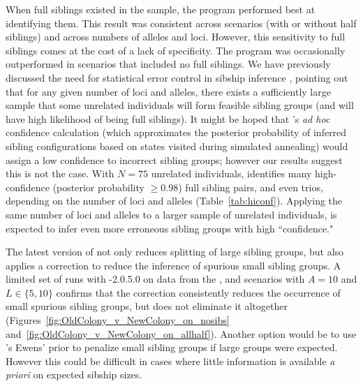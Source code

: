 When full siblings existed in the sample, the program \colony{} performed best at identifying them.  
This result was consistent across scenarios (with or without half siblings) and across numbers of 
alleles and loci.  However, this sensitivity to full siblings comes at the cost of a lack of 
specificity.  The program \colony{} was occasionally outperformed in scenarios that included no full 
siblings.  We have previously discussed the need for statistical error control in 
sibship inference \citep{alm&and11}, pointing out that for any given number of loci and alleles, there 
exists a sufficiently large sample that some unrelated individuals will form feasible sibling groups 
(and will have high likelihood of being full siblings).  It might be hoped that \colony{}'s {\em ad 
hoc} confidence calculation (which approximates the posterior probability of inferred sibling 
configurations based on states visited during simulated annealing) would assign a low confidence to 
incorrect sibling groups; however our results suggest this is not the case. With $N=75$ unrelated 
individuals, \colony{} identifies many high-confidence (posterior probability $\geq 0.98$) full sibling 
pairs, and even trios, depending on the number of loci and alleles (Table~\ref{tab:hiconf}).
Applying the same number of loci and alleles to a larger sample of unrelated individuals, \colony{} is 
expected to infer even more erroneous sibling groups with high ``confidence."

The latest version of \colony{} not only reduces splitting of large sibling groups, but also applies
a correction to reduce the inference of spurious small sibling groups.  A limited set of runs 
with \colony{}-2.0.5.0 on data from the \nosibs{}, \allhalf{} and \allpathalf{} scenarios with $A=10$ 
and $L\in\{5,10\}$ confirms that the correction consistently reduces the occurrence of small spurious 
sibling groups, but does not eliminate it altogether (Figures~\ref{fig:OldColony_v_NewColony_on_nosibs} 
and~\ref{fig:OldColony_v_NewColony_on_allhalf}). Another option would be to use \colony{}'s Ewens' prior to 
penalize small sibling groups if large groups were expected.  However this could be difficult
in cases where little information is available {\em a priori} on expected sibship sizes.


